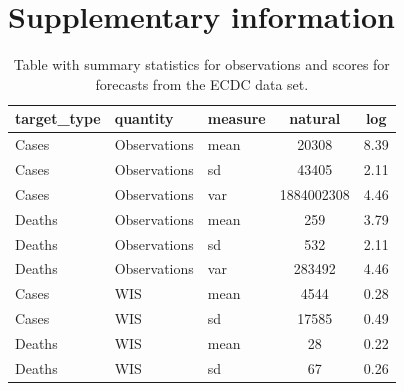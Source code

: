 \documentclass{article}
\begin{document}





\newpage

\appendix
\section{Supplementary information}

\begin{table}[h!]
    \centering
    
    \begin{tabular}{lllcc}
    \toprule
    target\_type & quantity & measure & natural & log\\
    \midrule
    Cases & Observations & mean & 20308 & 8.39\\
    Cases & Observations & sd & 43405 & 2.11\\
    Cases & Observations & var & 1884002308 & 4.46\\
    \addlinespace
    Deaths & Observations & mean & 259 & 3.79\\
    Deaths & Observations & sd & 532 & 2.11\\
    Deaths & Observations & var & 283492 & 4.46\\
    \addlinespace
    \hline
    \addlinespace
    Cases & WIS & mean & 4544 & 0.28\\
    Cases & WIS & sd & 17585 & 0.49\\
    \addlinespace
    Deaths & WIS & mean & 28 & 0.22\\
    Deaths & WIS & sd & 67 & 0.26\\
    \bottomrule
    \end{tabular}
    \caption{Table with summary statistics for observations and scores for forecasts from the ECDC data set.}
    \label{tab:HUB-summary}
\end{table}
\end{document}
